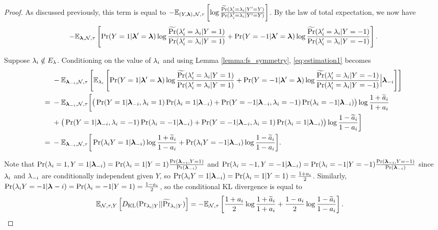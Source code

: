 \begin{proof}

As discussed previously, this term is equal to $-\mathbb{E}_{(Y, \bm{\lambda}), \mathcal{N}, \tau}\left[\log \frac{\widetilde{\Pr}(\lambda_i' = \lambda_i | Y' = Y)}{\Pr(\lambda_i' = \lambda_i | Y' = Y)}\right]$. By the law of total expectation, we now have
\begin{align}
    -\mathbb{E}_{\bm{\lambda}, \mathcal{N}, \tau}\left[ \Pr(Y = 1 | \bm{\lambda}' = \bm{\lambda}) \log \frac{\widetilde{\Pr}(\lambda_i' = \lambda_i | Y = 1)}{\Pr(\lambda_i' = \lambda_i | Y = 1)} +  \Pr(Y = -1 | \bm{\lambda}' = \bm{\lambda}) \log \frac{\widetilde{\Pr}(\lambda_i' = \lambda_i | Y = -1)}{\Pr(\lambda_i' = \lambda_i | Y = -1)}\right].
    \label{eq:estimation1}
\end{align}

Suppose $\lambda_i \notin E_{\lambda}$. Conditioning on the value of $\lambda_i$ and using Lemma \ref{lemma:fs_symmetry}, \eqref{eq:estimation1} becomes 
\begin{align*}
&-\mathbb{E}_{\bm{\lambda}_{-i}, \mathcal{N}, \tau}\left[\mathbb{E}_{\lambda_i}\left[\Pr(Y = 1 | \bm{\lambda}' = \bm{\lambda}) \log \frac{\widetilde{\Pr}(\lambda_i' = \lambda_i | Y = 1)}{\Pr(\lambda_i' = \lambda_i | Y = 1) }  + \Pr(Y = -1 | \bm{\lambda}' = \bm{\lambda}) \log \frac{\widetilde{\Pr}(\lambda_i' = \lambda_i | Y = -1)}{\Pr(\lambda_i' = \lambda_i | Y = -1)} \Big| \bm{\lambda}_{-i}\right]\right] \\
= \;&-\mathbb{E}_{\bm{\lambda}_{-i}, \mathcal{N}, \tau}\bigg[\big(\Pr(Y = 1 | \bm{\lambda}_{-i}, \lambda_i = 1) \Pr(\lambda_i = 1 | \bm{\lambda}_{-i}) + \Pr(Y = -1 | \bm{\lambda}_{-i}, \lambda_i = -1) \Pr(\lambda_i = -1 | \bm{\lambda}_{-i}) \big)\log \frac{1 + \widetilde{a}_i}{1 + a_i} \\
&+  \big(\Pr(Y = 1 | \bm{\lambda}_{-i}, \lambda_i = -1) \Pr(\lambda_i = -1 | \bm{\lambda}_{-i}) + \Pr(Y = -1 | \bm{\lambda}_{-i}, \lambda_i = 1) \Pr(\lambda_i = 1 | \bm{\lambda}_{-i})  \big)\log \frac{1 - \widetilde{a}_i}{1 - a_i} \bigg] \\
= \;& -\mathbb{E}_{\bm{\lambda}_{-i}, \mathcal{N}, \tau}\bigg[\Pr(\lambda_i Y = 1 | \bm{\lambda}_{-i}) \log \frac{1 + \widetilde{a}_i}{1 - a_i} + \Pr(\lambda_i Y = -1 | \bm{\lambda}_{-i})\log \frac{1 - \widetilde{a}_i}{1 - a_i} \bigg].
\end{align*}

Note that $\Pr(\lambda_i = 1, Y = 1 | \bm{\lambda}_{-i}) = \Pr(\lambda_i = 1 | Y = 1)  \frac{\Pr(\bm{\lambda}_{-i}, Y = 1)}{\Pr(\bm{\lambda}_{-i})}$ and $\Pr(\lambda_i = -1, Y = -1 | \bm{\lambda}_{-i}) = \Pr(\lambda_i = -1 | Y = -1) \frac{ \Pr(\bm{\lambda}_{-i}, Y = -1)}{\Pr(\bm{\lambda}_{-i})}$ since $\lambda_i$ and $\lambda_{-i}$ are conditionally independent given $Y$, so $\Pr(\lambda_i Y = 1 | \bm{\lambda}_{-i}) = \Pr(\lambda_i = 1| Y = 1) = \frac{1 + a_i}{2}$. Similarly, $\Pr(\lambda_i Y = -1 | \bm{\lambda}_{}-i) = \Pr(\lambda_i = -1 | Y = 1) = \frac{1 - a_i}{2}$, so the conditional KL divergence is equal to 
\begin{align}
\mathbb{E}_{\mathcal{N}, \tau, Y}\left[D_{\mathrm{KL}} (\mathrm{Pr}_{\lambda_i | Y} || \widetilde{\Pr}_{\lambda_i | Y} )\right] =-&\mathbb{E}_{\mathcal{N}, \tau}\left[\frac{1 + a_i}{2} \log \frac{1 + \widetilde{a}_i}{1 + a_i} + \frac{1 - a_i}{2} \log \frac{1 - \widetilde{a}_i}{1 - a_i}\right]. \label{eq:estimation2}
\end{align}


\end{proof}
